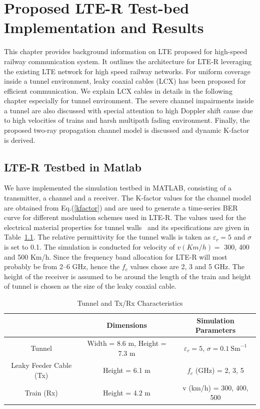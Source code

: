 \chapter{Proposed LTE-R Test-bed Implementation and Results}
\label{chapter4}

This chapter provides background information on LTE proposed for high-speed railway communication system. It outlines the architecture for LTE-R leveraging the existing LTE network for high speed railway networks. For uniform coverage inside a tunnel environment, leaky coaxial cables (LCX) has been proposed for efficient communication. We explain LCX cables in details in the following chapter especially for tunnel environment. The severe channel impairments inside a tunnel are also discussed with special attention to high Doppler shift cause due to high velocities of trains and harsh multipath fading environment. Finally, the proposed two-ray propagation channel model is discussed and dynamic K-factor is derived.

\section{LTE-R Testbed in Matlab}

We have implemented the simulation testbed in MATLAB, consisting of a transmitter, a channel and a receiver. The K-factor values for the channel model are obtained from Eq.(\ref{kfactor}) and are used to generate a time-series BER curve for different modulation schemes used in LTE-R. The values used for the electrical material properties for tunnel walls~\cite{lter17} and its
specifications are given in Table~\ref{tablelter}. The relative permittivity for the tunnel walls is taken as $\varepsilon_r = 5$ and $\sigma$ is set to 0.1. The simulation is conducted for velocity of $v (Km/h) = $ 300, 400 and 500 Km/h. Since the frequency band allocation for LTE-R will most probably be from 2--6 GHz, hence the $f_c$ values chose are 2, 3 and 5 GHz. The height of the receiver is assumed to be around the length of the train and height of tunnel is chosen as the size of the leaky coaxial cable.

\begin{table}[t!]
\centering
\caption{Tunnel and Tx/Rx Characteristics}
\begin{tabular}{c  c  c }
   & Dimensions & Simulation Parameters\\\hline
Tunnel & Width = 8.6 m, Height = 7.3 m & $\varepsilon_r = 5$, $\sigma = 0.1~\textrm{Sm}^{-1}$\\\hline
Leaky Feeder Cable (Tx) & Height = 6.1 m & $f_c$ (GHz) = 2, 3, 5\\\hline
Train (Rx) & Height = 4.2 m &  v (km/h) = 300, 400, 500\\
\hline
\end{tabular}
\label{tablelter}
\end{table}


